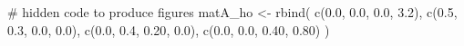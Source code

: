 \documentclass[
  12pt,
  letterpaper,
]{book}
\newenvironment{Shaded}{\begin{snugshade}}{\end{snugshade}}
\newcommand{\CommentTok}[1]{\textcolor[rgb]{0.37,0.37,0.37}{#1}}
\newcommand{\FloatTok}[1]{\textcolor[rgb]{0.68,0.00,0.00}{#1}}
\newcommand{\FunctionTok}[1]{\textcolor[rgb]{0.28,0.35,0.67}{#1}}
\newcommand{\NormalTok}[1]{\textcolor[rgb]{0.00,0.23,0.31}{#1}}
\newcommand{\OtherTok}[1]{\textcolor[rgb]{0.00,0.23,0.31}{#1}}
\begin{document}
\begin{Shaded}
\begin{Highlighting}[]
\CommentTok{\# hidden code to produce figures}
\NormalTok{matA\_ho }\OtherTok{\textless{}{-}} \FunctionTok{rbind}\NormalTok{(}
  \FunctionTok{c}\NormalTok{(}\FloatTok{0.0}\NormalTok{, }\FloatTok{0.0}\NormalTok{, }\FloatTok{0.0}\NormalTok{, }\FloatTok{3.2}\NormalTok{),}
  \FunctionTok{c}\NormalTok{(}\FloatTok{0.5}\NormalTok{, }\FloatTok{0.3}\NormalTok{, }\FloatTok{0.0}\NormalTok{, }\FloatTok{0.0}\NormalTok{),}
  \FunctionTok{c}\NormalTok{(}\FloatTok{0.0}\NormalTok{, }\FloatTok{0.4}\NormalTok{, }\FloatTok{0.20}\NormalTok{, }\FloatTok{0.0}\NormalTok{),}
  \FunctionTok{c}\NormalTok{(}\FloatTok{0.0}\NormalTok{, }\FloatTok{0.0}\NormalTok{, }\FloatTok{0.40}\NormalTok{, }\FloatTok{0.80}\NormalTok{)}
\NormalTok{)}



\end{Highlighting}
\end{Shaded}
\end{document}
